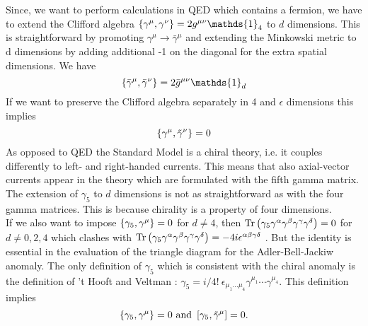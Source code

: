 Since, we want to perform calculations in QED which contains a fermion, we have to extend the Clifford algebra $\lbr \gamma^{\mu},\gamma^{\nu} \rbr = 2g^{\mu\nu} \mathds{1}_4$ to $d$ dimensions. This is straightforward by promoting $\gamma^{\mu} \rightarrow \bar{\gamma}^{\mu}$ and extending the Minkowski metric to d dimensions by adding additional -1 on the diagonal for the extra spatial dimensions. We have
\begin{equation}
\lbr \bar{\gamma}^{\mu},\bar{\gamma}^{\nu} \rbr = 2\bar{g}^{\mu\nu} \mathds{1}_d
\end{equation}
If we want to preserve the Clifford algebra separately in 4 and $\epsilon$ dimensions this implies
\begin{equation}
\left\lbrace \gamma^{\mu},\tilde{\gamma}^{\nu} \right\rbrace = 0
\end{equation}
As opposed to QED the Standard Model is a chiral theory, i.e. it couples differently to left- and right-handed currents. This means that also axial-vector currents appear in the theory which are formulated with the fifth gamma matrix. The extension of $\gamma_5$ to $d$ dimensions is not as straightforward as with the four gamma matrices. This is because chirality is a property of four dimensions.\\
If we also want to impose $\left\lbrace \gamma_5,\gamma^{\mu} \right\rbrace = 0$ for $d \neq 4$, then $\mathrm{Tr}\left( \gamma_5 \gamma^{\alpha}\gamma^{\beta}\gamma^{\gamma}\gamma^{\delta} \right) = 0$  for $d \neq 0,2,4$ which clashes with $\mathrm{Tr}\left( \gamma_5 \gamma^{\alpha}\gamma^{\beta}\gamma^{\gamma}\gamma^{\delta} \right) = -4i \epsilon^{\alpha\beta\gamma\delta}$ \cite{Gamma5}. But the identity is essential in the evaluation of the triangle diagram for the Adler-Bell-Jackiw anomaly. The only definition of $\gamma_5$ which is consistent with the chiral anomaly is the definition of 't Hooft and Veltman \cite{HVgamma5}: $\gamma_5 = i/4! \ \epsilon_{\mu_1 \dots \mu_4} \gamma^{\mu_1} \cdots \gamma^{\mu_4}$. This definition implies
\begin{equation}
\left\lbrace \gamma_5, \gamma^{\mu} \right\rbrace = 0  \text{ and }  \left[ \gamma_5, \tilde{\gamma}^{\mu} \right] = 0.
\end{equation} 



